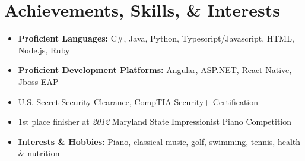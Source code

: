 \documentclass[11pt,letterpaper,sans]{moderncv}        %
\begin{document}
\section{Achievements, Skills, \& Interests}

\begin{itemize}[leftmargin=0.2in]
\setlength\itemsep{-3pt}
\item \textbf{Proficient Languages:} C\#, Java, Python, Typescript/Javascript, HTML, Node.js, Ruby
\item \textbf{Proficient Development Platforms:} Angular, ASP.NET, React Native, Jboss EAP
\item U.S. Secret Security Clearance, CompTIA Security+ Certification
\item 1st place finisher at \textit{2012} Maryland State Impressionist Piano Competition
\item \textbf{Interests \& Hobbies:} Piano, classical music, golf, swimming, tennis, health \& nutrition

\end{itemize}
\end{document}
